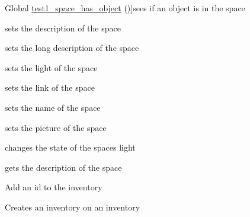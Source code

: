 \begin{DoxyRefList}
%
Global \hyperlink{space__tb_8c_a247a03054f7c51b2194b871c7baad91f}{test1\+\_\+space\+\_\+has\+\_\+object} ()]sees if an object is in the space  
\item[\label{test__test000053}%
\Hypertarget{test__test000053}%
Global \hyperlink{space__tb_8c_a3ae385d1f6050a35d6d765fabb6133db}{test1\+\_\+space\+\_\+set\+\_\+descrp} ()]sets the description of the space  
\item[\label{test__test000055}%
\Hypertarget{test__test000055}%
Global \hyperlink{space__tb_8c_a706e4c4bfacaf060f8d51ff58d6138cc}{test1\+\_\+space\+\_\+set\+\_\+ldescrp} ()]sets the long description of the space  
\item[\label{test__test000075}%
\Hypertarget{test__test000075}%
Global \hyperlink{space__tb_8c_ab7f3cc633044d49495ba98a303f028df}{test1\+\_\+space\+\_\+set\+\_\+light} ()]sets the light of the space  
\item[\label{test__test000061}%
\Hypertarget{test__test000061}%
Global \hyperlink{space__tb_8c_ac2c32b7992c776c7b9029c21916f34b1}{test1\+\_\+space\+\_\+set\+\_\+link} ()]sets the link of the space  
\item[\label{test__test000045}%
\Hypertarget{test__test000045}%
Global \hyperlink{space__tb_8c_a2569bab6cfeec15f722d232bb8c78c9e}{test1\+\_\+space\+\_\+set\+\_\+name} ()]sets the name of the space  
\item[\label{test__test000071}%
\Hypertarget{test__test000071}%
Global \hyperlink{space__tb_8c_a7d0786072c78c8ce93205aa735d599ca}{test1\+\_\+space\+\_\+set\+\_\+picture} ()]sets the picture of the space  
\item[\label{test__test000077}%
\Hypertarget{test__test000077}%
Global \hyperlink{space__tb_8c_ae50a68b97df24e69561053cc34f72ddb}{test1\+\_\+space\+\_\+toggle\+\_\+light} ()]changes the state of the space\textquotesingle{}s light  
\item[\label{test__test000048}%
\Hypertarget{test__test000048}%
Global \hyperlink{space__tb_8c_a5a5ce076d76e6acd3ad875229690dbde}{test2\+\_\+\+\_\+space\+\_\+get\+\_\+descrp} ()]gets the description of the space  
\item[\label{test__test000004}%
\Hypertarget{test__test000004}%
Global \hyperlink{inventory__tb_8c_abfb3407529398f76999549e42d567a7e}{test2\+\_\+inventory\+\_\+add\+\_\+id} ()]Add an id to the inventory  
\item[\label{test__test000002}%
\Hypertarget{test__test000002}%
Global \hyperlink{inventory__tb_8c_a73a6080c360a8870c4ffc734e989c8b3}{test2\+\_\+inventory\+\_\+create} ()]Creates an inventory on an inventory  

\end{DoxyRefList}
